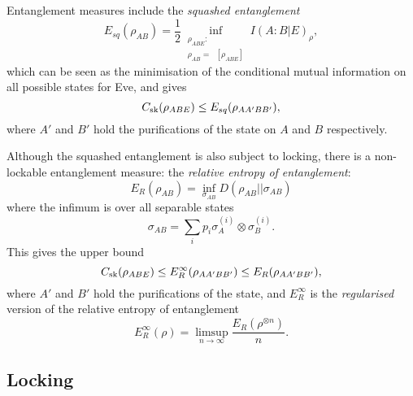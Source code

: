 \documentclass[10pt, a4paper]{article}
\numberwithin{equation}{section} %
\theoremstyle{definition}
\theoremstyle{plain}
\newcommand{\?}{\mathrel{?}} %
\newcommand{\Tr}[2][]{\mathop{\mathrm{Tr}#1}\left[ #2 \right]} %
\newcommand{\sk}{\rm sk}
\begin{document}
    Entanglement measures include the \emph{squashed entanglement}
    \begin{equation}
      E_{sq}(\rho_{A B}) = \frac{1}{2} \inf_{\substack{\rho_{A BE} : \\ \rho_{A B} = \Tr[_E]{\rho_{A BE}}}} I(A:B|E)_{\rho},
    \end{equation}
    which can be seen as the minimisation of the conditional mutual information on all possible states for Eve, and gives
    \begin{equation}
      C_{\sk}(\rho_{A B E}) \leq E_{sq}(\rho_{A A' B B'}),
    \end{equation}
    where \(A'\) and \(B'\) hold the purifications of the state on \(A\) and \(B\) respectively.

    Although the squashed entanglement is also subject to locking, there is a non-lockable entanglement measure: the \emph{relative entropy of entanglement}:
    \begin{equation}
      E_R\left({\rho_{AB}}\right) = \inf_{\sigma_{AB}} D(\rho_{AB}||\sigma_{AB})
    \end{equation}
    where the infimum is over all separable states
    \begin{equation}
      \sigma_{AB} = \sum_i p_i \sigma_{A}^{(i)} \otimes \sigma_{B}^{(i)}.
    \end{equation}
    This gives the upper bound
    \begin{equation}
      C_{\sk}(\rho_{A B E}) \leq E_{R}^{\infty}(\rho_{A A' B B'}) \leq E_{R}(\rho_{A A' B B'}),
    \end{equation}
    where \(A'\) and \(B'\) hold the purifications of the state, and \(E_{R}^{\infty}\) is the \emph{regularised} version of the relative entropy of entanglement
    \begin{equation}
      E_{R}^{\infty}(\rho) = \limsup_{n\to\infty} \frac{E_R(\rho^{\otimes n})}{n}.
    \end{equation}

    \subsection{Locking}\label{sec:diqkd_lock}
\end{document}

